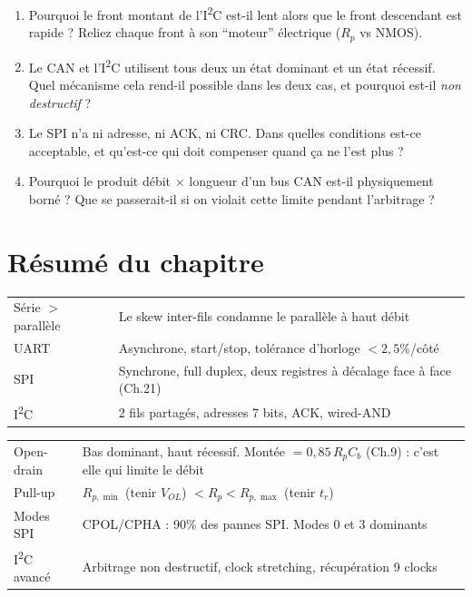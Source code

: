 \documentclass[12pt,a4paper,twoside]{book}
\begin{document}
\begin{enumerate}[nosep]
\item Pourquoi le front montant de l'I\textsuperscript{2}C est-il lent alors que le front descendant est rapide ? Reliez chaque front à son ``moteur'' électrique ($R_p$ vs NMOS).
\item Le CAN et l'I\textsuperscript{2}C utilisent tous deux un état dominant et un état récessif. Quel mécanisme cela rend-il possible dans les deux cas, et pourquoi est-il \textit{non destructif} ?
\item Le SPI n'a ni adresse, ni ACK, ni CRC. Dans quelles conditions est-ce acceptable, et qu'est-ce qui doit compenser quand ça ne l'est plus ?
\item Pourquoi le produit débit $\times$ longueur d'un bus CAN est-il physiquement borné ? Que se passerait-il si on violait cette limite pendant l'arbitrage ?
\end{enumerate}

\section*{Résumé du chapitre}

\begin{bases}[title={\color{white} Résumé --- Les Bases}]
\begin{center}
\renewcommand{\arraystretch}{1.3}
\begin{tabular}{p{3.5cm}p{9.5cm}}
\toprule
Série $>$ parallèle & Le skew inter-fils condamne le parallèle à haut débit \\
UART & Asynchrone, start/stop, tolérance d'horloge $< 2{,}5\%$/côté \\
SPI & Synchrone, full duplex, deux registres à décalage face à face (Ch.21) \\
I\textsuperscript{2}C & 2 fils partagés, adresses 7 bits, ACK, wired-AND \\
\bottomrule
\end{tabular}
\end{center}
\end{bases}

\begin{approfondissement}[title={\color{white} Résumé --- Approfondissement}]
\begin{center}
\renewcommand{\arraystretch}{1.3}
\begin{tabular}{p{3.5cm}p{9.5cm}}
\toprule
Open-drain & Bas dominant, haut récessif. Montée $= 0{,}85\,R_p C_b$ (Ch.9) : c'est elle qui limite le débit \\
Pull-up & $R_{p,\min}$ (tenir $V_{OL}$) $< R_p < R_{p,\max}$ (tenir $t_r$) \\
Modes SPI & CPOL/CPHA : 90\% des pannes SPI. Modes 0 et 3 dominants \\
I\textsuperscript{2}C avancé & Arbitrage non destructif, clock stretching, récupération 9 clocks \\
\bottomrule
\end{tabular}
\end{center}
\end{approfondissement}
\end{document}
